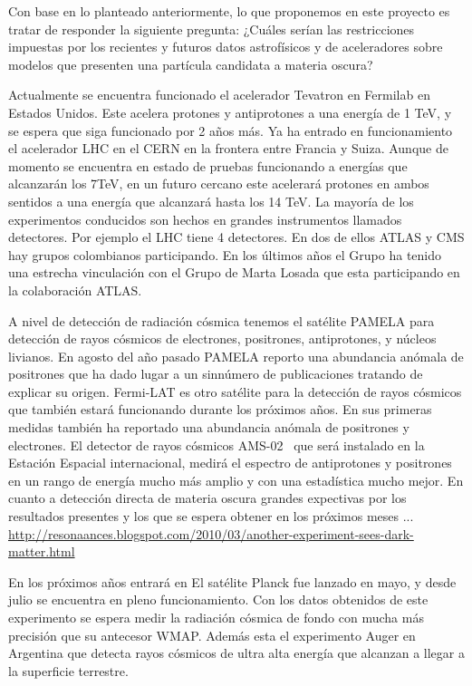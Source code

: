 Con base en lo planteado anteriormente, lo que proponemos en este proyecto es tratar de responder la siguiente pregunta: ¿Cuáles serían las restricciones impuestas por los recientes y futuros datos astrofísicos y de aceleradores sobre  modelos que presenten una partícula candidata a materia oscura?

Actualmente se encuentra funcionado el acelerador Tevatron en Fermilab en Estados Unidos. Este acelera protones y antiprotones a una energía de 1 TeV, y se espera que siga funcionado por 2 años más. Ya ha entrado en funcionamiento el acelerador LHC en el CERN en la frontera entre Francia y Suiza. Aunque de momento se encuentra en estado de pruebas funcionando a energías que alcanzarán los 7TeV, en un futuro cercano este  acelerará protones en ambos sentidos a una energía que alcanzará hasta los 14 TeV. La mayoría de los experimentos conducidos son hechos en grandes instrumentos llamados detectores. Por ejemplo el LHC tiene 4 detectores. En dos de ellos ATLAS y CMS hay grupos colombianos participando. En los últimos años el Grupo ha tenido una estrecha vinculación con el Grupo de Marta Losada que esta participando en la colaboración ATLAS.

A nivel de detección de radiación cósmica tenemos el satélite PAMELA para detección de rayos cósmicos de electrones, positrones, antiprotones, y núcleos livianos. En agosto del año pasado PAMELA reporto una abundancia anómala de positrones %
que ha dado lugar a un sinnúmero de publicaciones tratando de explicar su origen.  Fermi-LAT es otro satélite para la detección de rayos cósmicos que también estará funcionando  durante los próximos años. En sus primeras medidas %
también ha reportado una abundancia anómala de positrones y electrones. El detector de rayos cósmicos AMS-02~%
que será instalado en la Estación Espacial  internacional, medirá el espectro de antiprotones y positrones en un rango de energía mucho más amplio y con una estadística mucho mejor. En cuanto a detección directa de materia oscura grandes expectivas por los resultados presentes y los que se espera obtener en los próximos meses ... \url{http://resonaances.blogspot.com/2010/03/another-experiment-sees-dark-matter.html}

En los próximos años entrará en El satélite Planck fue lanzado en mayo, y desde julio  se encuentra en pleno funcionamiento. Con los datos obtenidos de este experimento se espera medir la radiación cósmica de fondo con mucha más precisión que su antecesor WMAP. Además esta el experimento Auger en Argentina que detecta rayos cósmicos de ultra alta energía que alcanzan a llegar a la superficie terrestre. 

